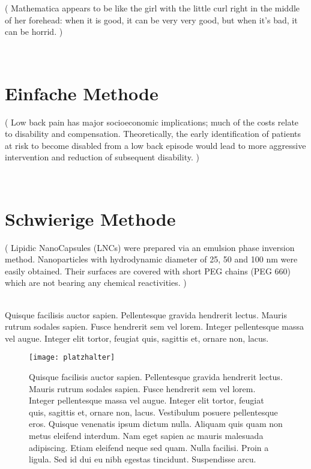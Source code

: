 

\begin{otherlanguage}{english}
(%
 \glqq Mathematica appears to be like the girl with the little curl right in the middle of her forehead:
 when it is good, it can be very very good, but when it's bad, it can be horrid.\grqq %
)
\end{otherlanguage}
\citep*[p.~12]{Wolfram:91}\\
\lipsum[1-2]
\section{Einfache Methode}
\begin{otherlanguage}{english}
(%
 \glqq Low back pain has major socioeconomic implications; 
 much of the costs relate to disability and compensation. 
 Theoretically, the early identification of patients at risk to become disabled from a low back episode 
 would lead to more aggressive intervention and reduction of subsequent disability.\grqq %
) 
\end{otherlanguage}
\citep*[p.~36]{Frymoyer:87}\\
\lipsum[1-5]

\section{Schwierige Methode}
\begin{otherlanguage}{english}
(%
 \glqq Lipidic NanoCapsules (LNCs) were prepared via an emulsion phase inversion method. 
 Nanoparticles with hydrodynamic diameter of 25, 50 and 100 nm were easily obtained. 
 Their surfaces are covered with short PEG chains (PEG 660) which are not bearing any chemical reactivities.\grqq %
) 
\end{otherlanguage}
\citep*[p.~3]{Perrier:11}\\
\lipsum[1-5]
Quisque facilisis auctor sapien. Pellentesque gravida hendrerit lectus. Mauris
rutrum sodales sapien. Fusce hendrerit sem vel lorem. Integer pellentesque massa vel augue. Integer
elit tortor, feugiat quis, sagittis et, ornare non, lacus.
\begin{figure}[h]
\texttt{[image: platzhalter]}
\caption[Quisque facilisis auctor sapien.]
{Quisque facilisis auctor sapien. Pellentesque gravida hendrerit lectus. Mauris
rutrum sodales sapien. Fusce hendrerit sem vel lorem. Integer pellentesque massa vel augue. Integer
elit tortor, feugiat quis, sagittis et, ornare non, lacus. Vestibulum posuere pellentesque eros. Quisque
venenatis ipsum dictum nulla. Aliquam quis quam non metus eleifend interdum. Nam eget sapien
ac mauris malesuada adipiscing. Etiam eleifend neque sed quam. Nulla facilisi. Proin a ligula. Sed
id dui eu nibh egestas tincidunt. Suspendisse arcu.} 
\end{figure}
\lipsum[1-5]
